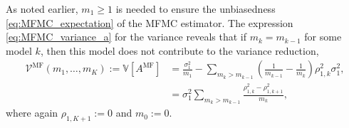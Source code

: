 As noted earlier,  $m_1 \ge 1$ is needed to ensure the unbiasedness \eqref{eq:MFMC_expectation}
of the MFMC estimator.
The expression  \eqref{eq:MFMC_variance_a} for the variance reveals that if
$m_k = m_{k-1}$ for some model $k$, then this model does not contribute to the variance reduction,
\begin{subequations}  \label{eq:MFMC_variance_k}
\begin{align}
    \mathcal{V}^{\text{MF}}(m_1, \ldots, m_K)
    :=  \mathbb{V}[A^{\text{MF}}]
   & = \frac{\sigma_1^2}{m_1} 
       - \sum_{m_k > m_{k-1}} \left(\frac{1}{m_{k-1}} - \frac{1}{m_k}\right) \rho_{1,k}^2 \sigma_1^2,   \label{eq:MFMC_variance_k_a} \\
   &= \sigma_1^2\sum_{m_k > m_{k-1}} \frac{ \rho_{1,k}^2 - \rho_{1,k+1}^2}{m_k},           \label{eq:MFMC_variance_k_b}
\end{align}
\end{subequations}
where again $\rho_{1,K+1} :=0$ and $m_0 := 0$.
